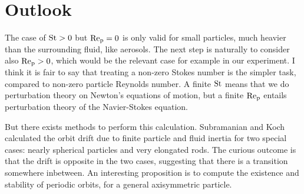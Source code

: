 \documentclass[thesis.tex]{subfiles}
\begin{document}
\section{Outlook}

The case of $\mbox{St}>0$ but $\mbox{Re}_{\mathrm p}=0$ is only valid for small particles, much heavier than the surrounding fluid, like aerosols. The next step is naturally to consider also $\mbox{Re}_{\mathrm p} > 0$, which would be the relevant case for example in our experiment. I think it is fair to say that treating a non-zero Stokes number is the simpler task, compared to non-zero particle Reynolds number. A finite $\mbox{St}$ means that we do perturbation theory on Newton's equations of motion, but a finite $\mbox{Re}_{\mathrm p}$ entails perturbation theory of the Navier-Stokes equation.

But there exists methods to perform this calculation. Subramanian and Koch \cite{sub05,sub06} calculated the orbit drift due to finite particle and fluid inertia for two special cases: nearly spherical particles and very elongated rods. The curious outcome is that the drift is opposite in the two cases, suggesting that there is a transition somewhere inbetween. An interesting proposition is to compute the existence and stability of periodic orbits, for a general axisymmetric particle. 
\end{document}
